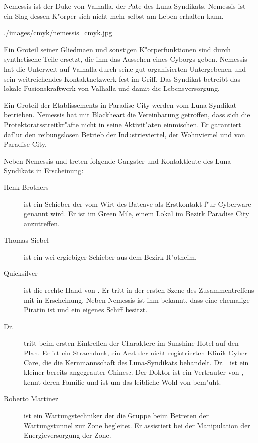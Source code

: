 
Nemessis ist der Duke von Valhalla, der Pate des Luna-Syndikats. Nemessis ist ein Slag dessen K"orper sich nicht mehr selbst am Leben erhalten kann. 

\begin{sideimagebox}[r]{0.9}{./images/cmyk/nemessis_cmyk.jpg}{}

\end{sideimagebox}

Ein Gro\3teil seiner Gliedma\3en und sonstigen K"orperfunktionen sind durch synthetische Teile ersetzt, die ihm das Aussehen eines Cyborgs geben. Nemessis hat die Unterwelt auf Valhalla durch seine gut organisierten Untergebenen und sein weitreichendes Kontaktnetzwerk
fest im Griff. Das Syndikat betreibt das lokale Fusionskraftwerk von Valhalla und damit die Lebensversorgung.

Ein Gro\3teil der Etablissements in Paradise City werden vom Luna-Syndikat betrieben. Nemessis hat mit Blackheart die Vereinbarung getroffen, dass sich die Protektoratsstreitkr"afte nicht in seine Aktivit"aten einmischen. Er garantiert daf"ur den reibungslosen Betrieb 
der Industrieviertel, der Wohnviertel und von Paradise City.


Neben Nemessis und \xl{} treten folgende Gangster und Kontaktleute des Luna-Syndikats in Erscheinung:

\begin{description}
    \item [Henk Brothers] ist ein Schieber der vom Wirt des Batcave als Erstkontakt f"ur Cyberware genannt wird. Er ist im Green Mile,  
        einem Lokal im Bezirk Paradise City anzutreffen.
    \item [Thomas Siebel] ist ein wei ergiebiger Schieber aus dem Bezirk R"otheim.
    \item [Quicksilver] ist die rechte Hand von \xl{}. Er tritt in der ersten Szene des Zusammentreffens mit \xl{} in 
        Erscheinung. Neben Nemessis ist ihm bekannt, dass \xl{} eine ehemalige Piratin ist und ein eigenes Schiff besitzt.
    \item [Dr.~ ] tritt beim ersten Eintreffen der Charaktere im Sunshine Hotel auf den Plan. Er ist ein  
        Stra\3endock, ein Arzt der nicht registrierten Klinik  Cyber Care, die die Kernmannschaft des Luna-Syndikats behandelt. Dr.~  ist ein kleiner bereits angegrauter Chinese. Der Doktor ist ein Vertrauter von \xl{}, kennt deren Familie und ist um das leibliche Wohl von \xl{} bem"uht.
    \item [Roberto Martinez] ist ein Wartungstechniker der die Gruppe beim Betreten der Wartungstunnel zur Zone begleitet. 
        Er assistiert \xl{} bei der Manipulation der Energieversorgung der Zone.
\end{description}
